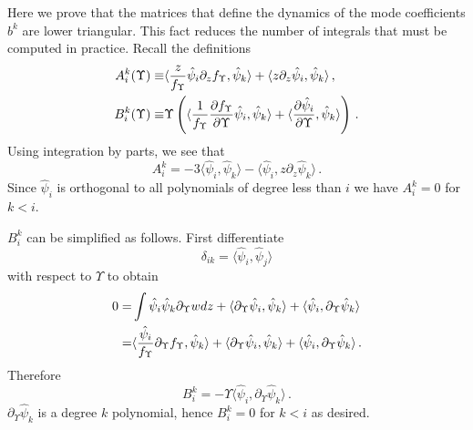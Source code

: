 Here we prove that the matrices that define the dynamics of the mode coefficients $b^k$ are lower triangular. This fact reduces the number of integrals that must be computed in practice.  Recall the definitions
\begin{align}\label{eq:lowerTri1}
A^k_i(\Upsilon)\equiv&\langle\frac{z}{f_\Upsilon }\hat\psi_i\partial_zf_\Upsilon ,\hat\psi_k\rangle+\langle z\partial_z \hat\psi_i,\hat\psi_k\rangle\,,\\
B^k_i(\Upsilon)\equiv &\Upsilon\left(\langle\frac{1}{f_\Upsilon }\frac{\partial f_\Upsilon }{\partial\Upsilon}\hat\psi_i,\hat\psi_k\rangle+\langle\frac{\partial\hat{\psi}_i}{\partial \Upsilon},\hat\psi_k\rangle\right)\,.\notag
\end{align}
Using integration by parts, we see that
\begin{equation}\label{eq:lowerTri2}
A^k_i=-3\langle\hat\psi_i,\hat\psi_k\rangle-\langle \hat \psi_i,z\partial_z\hat\psi_k\rangle\,.
\end{equation}
Since $\hat\psi_i$ is orthogonal to all polynomials of degree less than $i$ we have $A^k_i=0$ for  $k<i$.  

$B^k_i$ can be simplified as follows.  First differentiate 
\begin{equation}
\delta_{ik}=\langle \hat\psi_i,\hat\psi_j\rangle
\end{equation}
with respect to $\Upsilon$ to obtain
\begin{align}
0=&\int \hat\psi_i\hat\psi_k\partial_{\Upsilon}wdz+\langle \partial_{\Upsilon}\hat\psi_i,\hat\psi_k\rangle+\langle \hat\psi_i,\partial_{\Upsilon}\hat\psi_k\rangle\\
=&\langle\frac{\hat\psi_i}{f_\Upsilon}\partial_{\Upsilon}f_\Upsilon,\hat\psi_k \rangle+\langle\partial_{\Upsilon}\hat\psi_i,\hat\psi_k\rangle+\langle \hat\psi_i,\partial_{\Upsilon}\hat\psi_k\rangle\,.\notag
\end{align}
Therefore 
\begin{equation}\label{eq:lowerTri5}
B^k_i=-\Upsilon\langle\hat\psi_i,\partial_{\Upsilon}\hat\psi_k\rangle\,.
\end{equation}
$\partial_\Upsilon \hat\psi_k$ is a degree $k$ polynomial, hence $B_i^k=0$ for $k<i$ as desired.



